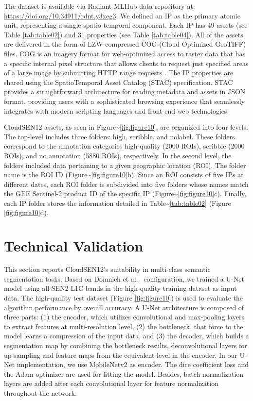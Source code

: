 \documentclass[a4paper, nobind]{templates/cdethesis}
\begin{document}
The dataset is available via Radiant MLHub\cite{dsds} data repository at: \href{https://doi.org/10.34911/rdnt.y3xeg3}{https://doi.org/10.34911/rdnt.y3xeg3}. We defined an IP as the primary atomic unit, representing a single spatio-temporal component. Each IP has 49 assets (see Table \ref{tab:table02}) and 31 properties (see Table \ref{tab:table04}). All of the assets are delivered in the form of LZW-compressed COG (Cloud Optimized GeoTIFF) files. COG is an imagery format for web-optimized access to raster data that has a specific internal pixel structure that allows clients to request just specified areas of a large image by submitting HTTP range requests \cite{IosifescuEnescu2021}. The IP properties are shared using the SpatioTemporal Asset Catalog (STAC) specification. STAC provides a straightforward architecture for reading metadata and assets in JSON format, providing users with a sophisticated browsing experience that seamlessly integrates with modern scripting languages and front-end web technologies.

CloudSEN12 assets, as seen in Figure\textasciitilde{}\ref{fig:figure10}, are organized into four levels. The top-level includes three folders: high, scribble, and nolabel. These folders correspond to the annotation categories high-quality (2000 ROIs), scribble (2000 ROIs), and no annotation (5880 ROIs), respectively. In the second level, the folders included data pertaining to a given geographic location (ROI). The folder name is the ROI ID (Figure\textasciitilde{}\ref{fig:figure10}b). Since an ROI consists of five IPs at different dates, each ROI folder is subdivided into five folders whose names match the GEE Sentinel-2 product ID of the specific IP (Figure\textasciitilde{}\ref{fig:figure10}c). Finally, each IP folder stores the information detailed in Table\textasciitilde{}\ref{tab:table02} (Figure \ref{fig:figure10}d).

\hypertarget{technical-validation}{%
\section{Technical Validation}\label{technical-validation}}

This section reports CloudSEN12's suitability in multi-class semantic segmentation tasks. Based on Domnich et al.~\cite{Domnich2021} configuration, we trained a U-Net \cite{unet} model using all SEN2 L1C bands in the high-quality training dataset as input data. The high-quality test dataset (Figure \ref{fig:figure10}) is used to evaluate the algorithm performance by overall accuracy. A U-Net architecture is composed of three parts: (1) the encoder, which utilizes convolutional and max-pooling layers to extract features at multi-resolution level, (2) the bottleneck, that force to the model learns a compression of the input data, and (3) the decoder, which builds a segmentation map by combining the bottleneck results, deconvolutional layers for up-sampling and feature maps from the equivalent level in the encoder. In our U-Net implementation, we use MobileNetv2 \cite{Sandler2018} as encoder. The dice coefficient loss and the Adam optimizer are used for fitting the model. Besides, batch normalization layers are added after each convolutional layer for feature normalization throughout the network.
\end{document}
